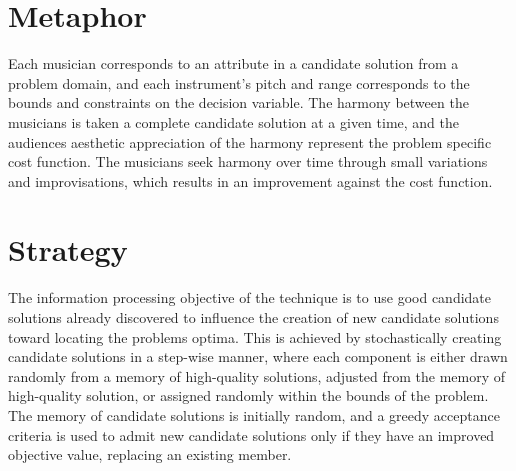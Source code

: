 \documentclass[a4paper, 11pt]{article}
\begin{document}
\section{Metaphor}
\label{sec:metaphor}
Each musician corresponds to an attribute in a candidate solution from a problem domain, and each instrument's pitch and range corresponds to the bounds and constraints on the decision variable. The harmony between the musicians is taken a complete candidate solution at a given time, and the audiences aesthetic appreciation of the harmony represent the problem specific cost function. The musicians seek harmony over time through small variations and improvisations, which results in an improvement against the cost function.

\section{Strategy}
\label{sec:strategy}
The information processing objective of the technique is to use good candidate solutions already discovered to influence the creation of new candidate solutions toward locating the problems optima.
This is achieved by stochastically creating candidate solutions in a step-wise manner, where each component is either drawn randomly from a memory of high-quality solutions, adjusted from the memory of high-quality solution, or assigned randomly within the bounds of the problem. The memory of candidate solutions is initially random, and a greedy acceptance criteria is used to admit new candidate solutions only if they have an improved objective value, replacing an existing member.

\end{document}
